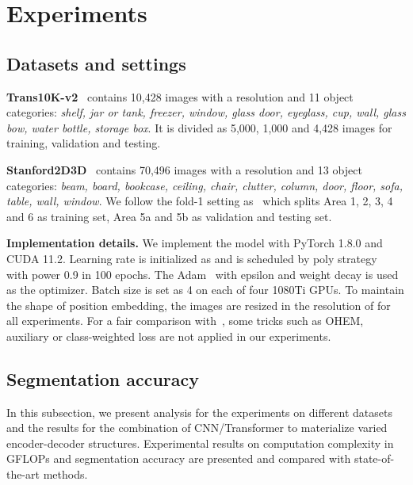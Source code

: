 \documentclass[10pt,twocolumn,letterpaper]{article}
\begin{document}
\section{Experiments}

\subsection{Datasets and settings}
\noindent\textbf{Trans10K-v2}~\cite{xie2021segmenting} contains 10,428 images with a  resolution and 11 object categories: \emph{shelf, jar or tank, freezer, window, glass door, eyeglass, cup, wall, glass bow, water bottle, storage box}. It is divided as 5,000, 1,000 and 4,428 images for training, validation and testing.

\noindent\textbf{Stanford2D3D}~\cite{stanford2d3d} contains 70,496 images with a  resolution and 13 object categories: \emph{beam, board, bookcase, ceiling, chair, clutter, column, door, floor, sofa, table, wall, window}. We follow the fold-1 setting as~\cite{stanford2d3d} which splits Area 1, 2, 3, 4 and 6 as training set, Area 5a and 5b as validation and testing set.

\noindent\textbf{Implementation details.} We implement the model with PyTorch 1.8.0 and CUDA 11.2. Learning rate is initialized as  and is scheduled by poly strategy~\cite{bisenet} with power 0.9 in 100 epochs. The Adam~\cite{adam_optimization} with epsilon  and weight decay  is used as the optimizer. Batch size is set as 4 on each of four 1080Ti GPUs. To maintain the shape of position embedding, the images are resized in the resolution of  for all experiments. For a fair comparison with~\cite{xie2021segmenting}, some tricks such as OHEM, auxiliary or class-weighted loss are not applied in our experiments.

\subsection{Segmentation accuracy}
In this subsection, we present analysis for the experiments on different datasets and the results for the combination of CNN/Transformer to materialize varied encoder-decoder structures. Experimental results on computation complexity in GFLOPs and segmentation accuracy are presented and compared with state-of-the-art methods. 
\end{document}
